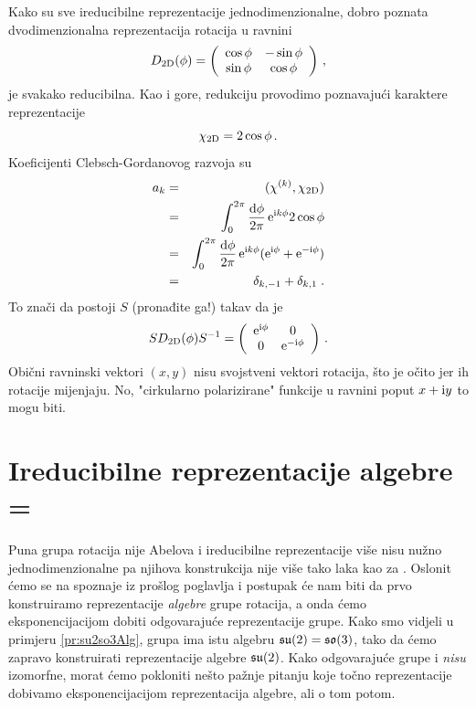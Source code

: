 Kako su sve ireducibilne reprezentacije jednodimenzionalne,
dobro poznata dvodimenzionalna reprezentacija rotacija u ravnini
\begin{equation}        
 D_{\rm 2D} (\phi) = \left( 
\begin{array}{cc}        
\cos\phi & -\sin\phi \\
\sin\phi & \cos\phi
\end{array}                
\right) \,, 
\end{equation}
je svakako reducibilna. Kao i gore, redukciju provodimo
poznavajući karaktere reprezentacije
\begin{equation}
    \chi_{\rm 2D}=2\cos\phi \,.
\end{equation}
Koeficijenti Clebsch-Gordanovog razvoja su
\begin{eqnarray*}
a_k & = & (\chi^{(k)}, \chi_{\rm 2D}) \\
    & = & \int_{0}^{2\pi}\frac{\textrm{d} \phi}{2\pi}\,
   \textrm{e}^{\textrm{\scriptsize i} k \phi} 2\cos\phi  \\
 & = & \int_{0}^{2\pi}\frac{\textrm{d} \phi}{2\pi}\,
  \textrm{e}^{\textrm{\scriptsize i} k \phi} ( \textrm{e}^{\textrm{\scriptsize i}  \phi} + \textrm{e}^{-\textrm{\scriptsize i}  \phi}) \\
 & = & \delta_{k,-1} + \delta_{k, 1} \;.
\end{eqnarray*}
To znači da postoji $S$ (pronađite ga!) takav da je
\begin{equation}
  S D_{\rm 2D} (\phi) S^{-1} = \left(
\begin{array}{cc}        
\textrm{e}^{\textrm{\scriptsize i}  \phi} &  0 \\
0 & \textrm{e}^{- \textrm{\scriptsize i}  \phi}
\end{array}                
\right) \,.
\end{equation}
Obični ravninski vektori $(x, y)$ nisu svojstveni vektori
rotacija, što je očito jer ih rotacije mijenjaju. No, "cirkularno
polarizirane" funkcije u ravnini poput $x + \textrm{i} y$ to mogu biti.


\section{Ireducibilne reprezentacije algebre  = }
 
\label{sec:repsu2}

Puna grupa rotacija  nije Abelova i ireducibilne
reprezentacije više nisu nužno jednodimenzionalne pa njihova konstrukcija nije
više tako laka kao za .
Oslonit ćemo se na spoznaje iz prošlog poglavlja i
postupak će nam biti da prvo konstruiramo
reprezentacije  \emph{algebre} grupe rotacija, a onda
ćemo eksponencijacijom dobiti odgovarajuće reprezentacije grupe.
Kako smo vidjeli u primjeru \ref{pr:su2so3Alg}, grupa 
ima istu algebru $\mathfrak{su}(2)=\mathfrak{so}(3)$, tako da ćemo zapravo
konstruirati reprezentacije algebre $\mathfrak{su}(2)$. Kako odgovarajuće
grupe  i  \emph{nisu} izomorfne, morat ćemo pokloniti
nešto pažnje pitanju koje točno reprezentacije dobivamo eksponencijacijom
reprezentacija algebre, ali o tom potom.


